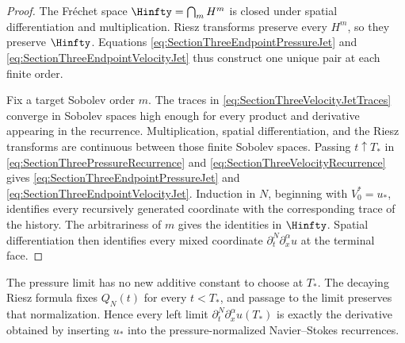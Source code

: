 \begin{proof}
The Fr\'echet space \(\Hinfty=\bigcap_mH^m\) is closed under spatial differentiation and multiplication.
Riesz transforms preserve every \(H^m\), so they preserve \(\Hinfty\).
Equations \eqref{eq:SectionThreeEndpointPressureJet} and \eqref{eq:SectionThreeEndpointVelocityJet} thus construct one unique pair at each finite order.

Fix a target Sobolev order \(m\).
The traces in \eqref{eq:SectionThreeVelocityJetTraces} converge in Sobolev spaces high enough for every product and derivative appearing in the recurrence.
Multiplication, spatial differentiation, and the Riesz transforms are continuous between those finite Sobolev spaces.
Passing \(t\uparrow T_*\) in \eqref{eq:SectionThreePressureRecurrence} and \eqref{eq:SectionThreeVelocityRecurrence} gives \eqref{eq:SectionThreeEndpointPressureJet} and \eqref{eq:SectionThreeEndpointVelocityJet}.
Induction in \(N\), beginning with \(V_0^*=u_*\), identifies every recursively generated coordinate with the corresponding trace of the history.
The arbitrariness of \(m\) gives the identities in \(\Hinfty\).
Spatial differentiation then identifies every mixed coordinate \(\partial_t^N\partial_x^\alpha u\) at the terminal face.
\end{proof}

The pressure limit has no new additive constant to choose at \(T_*\).
The decaying Riesz formula fixes \(Q_N(t)\) for every \(t<T_*\), and passage to the limit preserves that normalization.
Hence every left limit \(\partial_t^N\partial_x^\alpha u(T_*)\) is exactly the derivative obtained by inserting \(u_*\) into the pressure-normalized Navier--Stokes recurrences.
